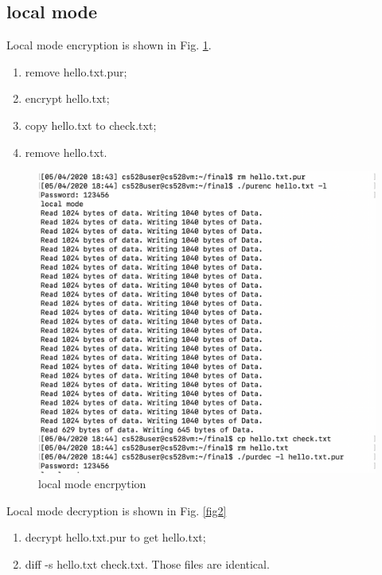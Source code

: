 \documentclass[11pt, oneside]{article}   	%
\begin{document}
\subsection{local mode}
Local mode encryption is shown in Fig. \ref{fig1}. 
\begin{enumerate}
\item remove hello.txt.pur; 
\item encrypt hello.txt;
\item copy hello.txt to check.txt;
\item remove hello.txt.
\end{enumerate}
\begin{figure}[htbp]
   \centering
   \includegraphics[scale = 0.7]{local1.png} %
   \caption{local mode encrpytion}
   \label{fig1}
\end{figure}

Local mode decryption is shown in Fig. \ref{fig2}
\begin{enumerate}
\item decrypt hello.txt.pur to get hello.txt;
\item diff -s hello.txt check.txt. Those files are identical.
\end{enumerate}
\end{document}

